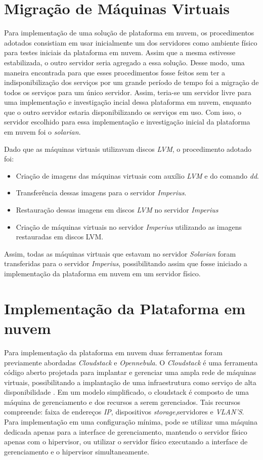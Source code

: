 \section{Migração de Máquinas Virtuais}
Para implementação de uma solução de plataforma em nuvem, os procedimentos adotados consistiam em usar inicialmente um dos servidores como ambiente físico  para testes iniciais da plataforma em nuvem. Assim que a mesma estivesse estabilizada, o outro servidor seria agregado a essa solução. Desse modo, uma maneira encontrada para que esses procedimentos fosse feitos sem ter a indisponibilização dos serviços por um grande período de tempo foi a migração de todos os serviços para um único servidor. Assim, teria-se um servidor livre para uma implementação e investigação incial dessa plataforma em nuvem, enquanto que o outro servidor estaria disponibilizando os serviços em uso. Com isso, o servidor escolhido para essa implementação e investigação inicial da plataforma em nuvem foi o \textit{solarian}. 

Dado que as máquinas virtuais utilizavam discos \textit{LVM}, o procedimento adotado foi:
\begin{itemize}
  \item Criação de imagens das máquinas virtuais com auxílio  \textit{LVM} e do comando \textit{dd}.
  \item Transferência dessas imagens para o servidor \textit{Imperius}.
  \item Restauração dessas imagens em discos \textit{LVM} no servidor \textit{Imperius}
  \item Criação de máquinas virtuais no servidor \textit{Imperius} utilizando as imagens restauradas em discos LVM.
  
\end{itemize}

Assim, todas as máquinas virtuais que estavam no servidor \textit{Solarian} foram transferidas para o servidor \textit{Imperius}, possibilitando assim que fosse iniciado a implementação da plataforma em nuvem em um servidor físico.


\section{Implementação da Plataforma em nuvem}
Para implementação da plataforma em nuvem duas ferramentas foram previamente abordadas \textit{Cloudstack} e \textit{Opennebula}. O \textit{Cloudstack} é uma ferramenta código aberto projetada para implantar e gerenciar uma ampla rede de máquinas virtuais, possibilitando a implantação de uma infraestrutura como serviço de alta disponibilidade \cite{cloudstack}. Em um modelo simplificado, o cloudstack é composto de uma máquina de gerenciamento e dos recursos a serem gerenciados. Tais recursos compreende: faixa de endereços \textit{IP}, dispositivos \textit{storage},servidores e \textit{VLAN'S}. Para implementação em uma configuração mínima, pode se utilizar uma máquina dedicada apenas para a interface de gerenciamento, mantendo o servidor físico apenas com o hipervisor, ou utilizar o servidor físico executando a interface de gerenciamento e o hipervisor simultaneamente. 

